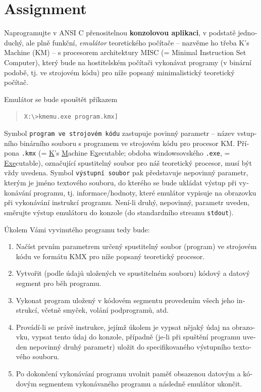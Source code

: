 \documentclass[12pt,a4paper]{paper}
\newcommand{\code}[1]{\texttt{#1}}
\begin{document}
\section{Assignment}
\begin{otherlanguage}{czech}

Naprogramujte v ANSI C přenositelnou \textbf{konzolovou aplikaci}, v podstatě
jednoduchý, ale plně funkční, \textit{emulátor} teoretického počítače – nazvěme
ho třeba K’s Machine (KM) – s procesorem architektury MISC (= Minimal
Instruction Set Computer), který bude na hostitelském počítači vykonávat
programy (v binární podobě, tj. ve strojovém kódu) pro níže popsaný
minimalistický teoretický počítač.

Emulátor se bude spouštět příkazem

\begin{quotation}
\code{X:\textbackslash>kmemu.exe \textlangle program.kmx\textrangle
[\textlangle výstupní soubor[.txt]\textrangle]}
\end{quotation}

Symbol \code{\textlangle program ve strojovém kódu\textrangle} zastupuje povinný
parametr – název vstupního binárního souboru s programem ve strojovém kódu pro
procesor KM. Přípona \code{.kmx} (\foreignlanguage{english}{= \underline{K}’s
\underline{M}achine E\underline{x}ecutable}; obdoba windowsovského \code{.exe},
\foreignlanguage{english}{= \underline{Exe}cutable}), označující spustitelný
soubor pro náš teoretický procesor, musí být vždy uvedena. Symbol
\code{\textlangle výstupní soubor\textrangle} pak představuje nepovinný
parametr, kterým je jméno textového souboru, do kterého se bude ukládat výstup
při vykonávání programu, tj. informace/hodnoty, které emulátor vypisuje na
obrazovku při vykonávání instrukcí programu. Není-li druhý, nepovinný, parametr
uveden, směrujte výstup emulátoru do konzole (do standardního streamu
\code{stdout}).

Úkolem Vámi vyvinutého programu tedy bude:

\begin{enumerate}
\item Načíst prvním parametrem určený spustitelný soubor (program) ve strojovém
    kódu ve formátu KMX pro níže popsaný teoretický procesor. \\
\item Vytvořit (podle údajů uložených ve spustitelném souboru) kódový a datový
    segment pro běh programu. \\
\item Vykonat program uložený v kódovém segmentu provedením všech jeho
    instrukcí, včetně smyček, volání podprogramů, atd. \\
\item Provádí-li se právě instrukce, jejímž úkolem je vypsat nějaký údaj na
    obrazovku, vypsat tento údaj do konzole, případně (je-li při spuštění
    programu uveden nepovinný druhý parametr) uložit do specifikovaného
    výstupního textového souboru. \\
\item Po dokončení vykonávání programu uvolnit paměť obsazenou datovým a kódovým
segmentem vykonávaného programu a následně emulátor ukončit. \\


\end{enumerate}
\end{otherlanguage}
\end{document}

